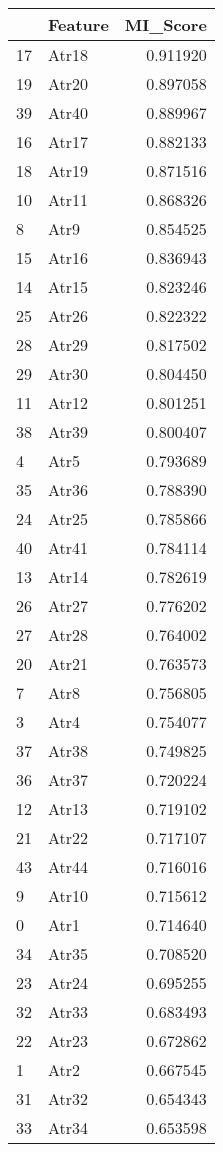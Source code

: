 \begin{tabular}{llr}
\toprule
 & Feature & MI_Score \\
\midrule
17 & Atr18 & 0.911920 \\
19 & Atr20 & 0.897058 \\
39 & Atr40 & 0.889967 \\
16 & Atr17 & 0.882133 \\
18 & Atr19 & 0.871516 \\
10 & Atr11 & 0.868326 \\
8 & Atr9 & 0.854525 \\
15 & Atr16 & 0.836943 \\
14 & Atr15 & 0.823246 \\
25 & Atr26 & 0.822322 \\
28 & Atr29 & 0.817502 \\
29 & Atr30 & 0.804450 \\
11 & Atr12 & 0.801251 \\
38 & Atr39 & 0.800407 \\
4 & Atr5 & 0.793689 \\
35 & Atr36 & 0.788390 \\
24 & Atr25 & 0.785866 \\
40 & Atr41 & 0.784114 \\
13 & Atr14 & 0.782619 \\
26 & Atr27 & 0.776202 \\
27 & Atr28 & 0.764002 \\
20 & Atr21 & 0.763573 \\
7 & Atr8 & 0.756805 \\
3 & Atr4 & 0.754077 \\
37 & Atr38 & 0.749825 \\
36 & Atr37 & 0.720224 \\
12 & Atr13 & 0.719102 \\
21 & Atr22 & 0.717107 \\
43 & Atr44 & 0.716016 \\
9 & Atr10 & 0.715612 \\
0 & Atr1 & 0.714640 \\
34 & Atr35 & 0.708520 \\
23 & Atr24 & 0.695255 \\
32 & Atr33 & 0.683493 \\
22 & Atr23 & 0.672862 \\
1 & Atr2 & 0.667545 \\
31 & Atr32 & 0.654343 \\
33 & Atr34 & 0.653598 \\

\end{tabular}
